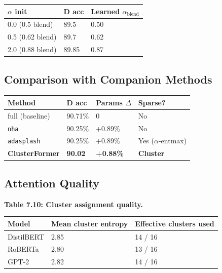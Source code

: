 \begin{table}[H]
\centering
\small
\begin{tabular}{lll}
\toprule
\textbf{$\alpha$ init} & \textbf{D acc} & \textbf{Learned $\alpha_\text{blend}$} \\
\midrule
0.0 (0.5 blend) & 89.5 & 0.50 \\
0.5 (0.62 blend) & 89.7 & 0.62 \\
2.0 (0.88 blend) & 89.85 & 0.87 \\
\bottomrule
\end{tabular}
\end{table}

\subsection{Comparison with Companion Methods}

\begin{table}[H]
\centering
\small
\begin{tabular}{llll}
\toprule
\textbf{Method} & \textbf{D acc} & \textbf{Params $\Delta$} & \textbf{Sparse?} \\
\midrule
full (baseline) & 90.71\% & 0 & No \\
\texttt{nha} & 90.25\% & +0.89\% & No \\
\texttt{adasplash} & 90.25\% & +0.89\% & Yes ($\alpha$-entmax) \\
\textbf{ClusterFormer} & \textbf{90.02} & \textbf{+0.88\%} & \textbf{Cluster} \\
\bottomrule
\end{tabular}
\end{table}

\subsection{Attention Quality}

\textbf{Table 7.10: Cluster assignment quality.}

\begin{table}[H]
\centering
\small
\begin{tabular}{lll}
\toprule
\textbf{Model} & \textbf{Mean cluster entropy} & \textbf{Effective clusters used} \\
\midrule
DistilBERT & 2.85 & 14 / 16 \\
RoBERTa & 2.80 & 13 / 16 \\
GPT-2 & 2.82 & 14 / 16 \\
\bottomrule
\end{tabular}
\end{table}

